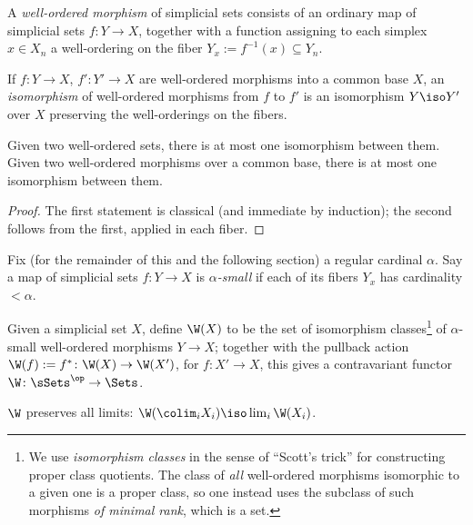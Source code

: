 \begin{definition}
A \emph{well-ordered morphism} of simplicial sets consists of an ordinary map of simplicial sets $f \colon Y \to X$, together with a function assigning to each simplex $x \in X_n$ a well-ordering on the fiber $Y_x := f^{-1}(x) \subseteq Y_n$.

If $f \colon Y \to X$, $f' \colon Y' \to X$ are well-ordered morphisms into a common base $X$, an \emph{isomorphism} of well-ordered morphisms from $f$ to $f'$ is an isomorphism $Y \iso Y'$ over $X$ preserving the well-orderings on the fibers.
\end{definition}

\begin{proposition} \label{prop:well-orderings-rigid}
Given two well-ordered sets, there is at most one isomorphism between them.  Given two well-ordered morphisms over a common base, there is at most one isomorphism between them.
\end{proposition}

\begin{proof}
The first statement is classical (and immediate by induction); the second follows from the first, applied in each fiber.
\end{proof}

\begin{definition}
Fix (for the remainder of this and the following section) a regular cardinal $\alpha$.  Say a map of simplicial sets $f \colon Y \to X$ is \emph{$\alpha$-small} if each of its fibers $Y_x$ has cardinality $< \alpha$.
\end{definition}

Given a simplicial set $X$, define $\W (X)$ to be the set of isomorphism classes\footnote{We use \emph{isomorphism classes} in the sense of “Scott’s trick” \cite{scott:scotts-trick} for constructing proper class quotients.  The class of \emph{all} well-ordered morphisms isomorphic to a given one is a proper class, so one instead uses the subclass of such morphisms \emph{of minimal rank}, which is a set.} of $\alpha$-small well-ordered morphisms $Y \to X$; together with the pullback action $\W(f) := f^* \colon \W(X) \to \W(X')$, for $f \colon X' \to X$, this gives a contravariant functor $\W \colon \sSets^{\op} \to \Sets$.

\begin{lemma} \label{lemma:w-preserves-lims}
$\W$ preserves all limits: $\W(\colim_i X_i) \iso \lim_i \W(X_i)$. 
\end{lemma}


